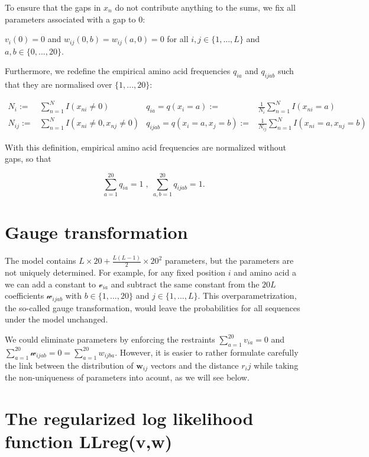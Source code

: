 \documentclass[12pt,a4paper,twoside]{book}
\newcommand{\eq}{\!=\!}
\newcommand{\via}{\mathcal{v}_{ia}}
\newcommand{\w}{\mathbf{w}}
\newcommand{\wijab}{\mathcal{w}_{ijab}}
\theoremstyle{definition}
\theoremstyle{definition}
\theoremstyle{remark}
\begin{document}
To ensure that the gaps in \(x_n\) do not contribute anything to the
sums, we fix all parameters associated with a gap to 0:

\(v_i(0) = 0\) and \(w_{ij}(0, b) = w_{ij}(a, 0) = 0\) for all
\(i, j \in \{1, ..., L\}\) and \(a, b \in \{0, ..., 20\}\).

Furthermore, we redefine the empirical amino acid frequencies \(q_{ia}\)
and \(q_{ijab}\) such that they are normalised over \(\{1, ..., 20\}\):

\begin{align}
   N_i :=& \sum_{n=1}^N  I(x_{ni} \!\ne\! 0) &  q_{ia} = q(x_i \eq a) :=& \frac{1}{N_i} \sum_{n=1}^N I(x_{ni} \eq a)   \\
   N_{ij} :=& \sum_{n=1}^N  I(x_{ni} \!\ne\! 0, x_{nj} \!\ne\! 0)  &  q_{ijab} = q(x_i \eq a, x_j \eq b) :=& \frac{1}{N_{ij}} \sum_{n=1}^N I(x_{ni} \eq a, x_{nj} \eq b)
\end{align}

With this definition, empirical amino acid frequencies are normalized
without gaps, so that

\begin{equation}
    \sum_{a=1}^{20} q_{ia} = 1      \; , \;     \sum_{a,b=1}^{20} q_{ijab} = 1.
\label{eq:normalized-emp-freq}
\end{equation}

\section{Gauge transformation}\label{gauge-transformation}

The model contains \(L \times 20 + \frac{L(L − 1)}{2} \times 20^2\)
parameters, but the parameters are not uniquely determined. For example,
for any fixed position \(i\) and amino acid a we can add a constant to
\(\via\) and subtract the same constant from the \(20L\) coefficients
\(\wijab\) with \(b \in \{1, ..., 20\}\) and \(j \in \{1, ..., L\}\).
This overparametrization, the so-called gauge transformation, would
leave the probabilities for all sequences under the model unchanged.

We could eliminate parameters by enforcing the restraints
\(\sum_{a=1}^{20} v_{ia} = 0\) and
\(\sum_{a=1}^{20} \wijab = 0 = \sum_{a=1}^{20} w_{ijba}\). However, it
is easier to rather formulate carefully the link between the
distribution of \(\w_{ij}\) vectors and the distance \(r_ij\) while
taking the non-uniqueness of parameters into acount, as we will see
below.

\section{The regularized log likelihood function
LLreg(v,w)}\label{the-regularized-log-likelihood-function-llregvw}
\end{document}
